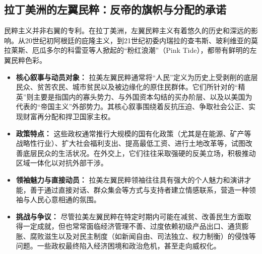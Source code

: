 \documentclass[UTF8, 10pt]{ctexbook}
\begin{document}
\subsection{拉丁美洲的左翼民粹：反帝的旗帜与分配的承诺}
民粹主义并非右翼的专利。在拉丁美洲，左翼民粹主义有着悠久的历史和深远的影响。从20世纪初阿根廷的庇隆主义，到21世纪初委内瑞拉的查韦斯、玻利维亚的莫拉莱斯、厄瓜多尔的科雷亚等人掀起的“粉红浪潮”（Pink Tide），都带有鲜明的左翼民粹色彩。
\begin{itemize}
    \item \textbf{核心叙事与动员对象：} 拉美左翼民粹通常将“人民”定义为历史上受剥削的底层民众、贫苦农民、城市贫民以及被边缘化的原住民群体。它们所针对的“精英”则主要是指国内的寡头势力、与外国资本勾结的买办阶层、以及以美国为代表的“帝国主义”外部势力。其核心叙事围绕着反抗压迫、争取社会公正、实现财富再分配和捍卫国家主权。
    \item \textbf{政策特点：} 这些政权通常推行大规模的国有化政策（尤其是在能源、矿产等战略性行业）、扩大社会福利支出、提高最低工资、进行土地改革等，试图改善底层民众的生活状况。在外交上，它们往往采取强硬的反美立场，积极推动区域一体化以对抗外部干涉。
    \item \textbf{领袖魅力与直接动员：} 拉美左翼民粹领袖往往具有强大的个人魅力和演讲才能，善于通过直接对话、群众集会等方式与支持者建立情感联系，营造一种领袖与人民心意相通的氛围。
    \item \textbf{挑战与争议：} 尽管拉美左翼民粹在特定时期内可能在减贫、改善民生方面取得一定成就，但也常常面临经济管理不善、过度依赖初级产品出口、通货膨胀、腐败滋生以及对民主制度（如新闻自由、司法独立、权力制衡）的侵蚀等问题。一些政权最终陷入经济困境和政治危机，甚至走向威权化。
\end{itemize}
\end{document}
